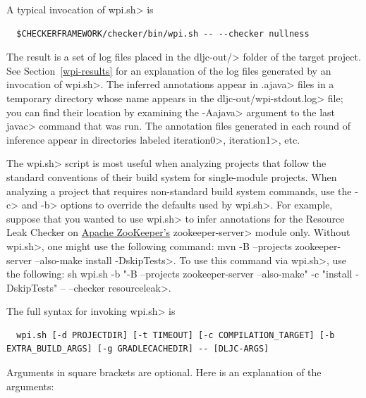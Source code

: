 
A typical invocation of \<wpi.sh> is

\begin{Verbatim}
  $CHECKERFRAMEWORK/checker/bin/wpi.sh -- --checker nullness
\end{Verbatim}

The result is a set of log files placed in the \<dljc-out/> folder of the
target project.
See Section~\ref{wpi-results} for an explanation of the log files generated by
an invocation of \<wpi.sh>.
The inferred annotations appear in \<.ajava> files in a
temporary directory whose name appears in the \<dljc-out/wpi-stdout.log> file;
you can find their location by examining the \<-Aajava> argument
to the last \<javac> command that was run. The annotation files generated in
each round of inference appear in directories labeled \<iteration0>, \<iteration1>, etc.

The \<wpi.sh> script is most useful when analyzing projects that follow the standard
conventions of their build system for single-module projects. When analyzing a project
that requires non-standard build system commands, use the \<-c> and \<-b> options to
override the defaults used by \<wpi.sh>. For example, suppose that you wanted to use
\<wpi.sh> to infer annotations for the Resource Leak Checker on
\href{https://github.com/apache/zookeeper}{Apache ZooKeeper's}
\<zookeeper-server> module only. Without \<wpi.sh>, one might use the following command:
\<mvn -B --projects zookeeper-server --also-make install -DskipTests>. To use this command via
\<wpi.sh>, use the following:
\<sh wpi.sh -b "-B --projects zookeeper-server --also-make" -c "install -DskipTests" -- --checker resourceleak>.

The full syntax for invoking \<wpi.sh> is

\begin{Verbatim}
  wpi.sh [-d PROJECTDIR] [-t TIMEOUT] [-c COMPILATION_TARGET] [-b EXTRA_BUILD_ARGS] [-g GRADLECACHEDIR] -- [DLJC-ARGS]
\end{Verbatim}

Arguments in square brackets are optional.
Here is an explanation of the arguments:

